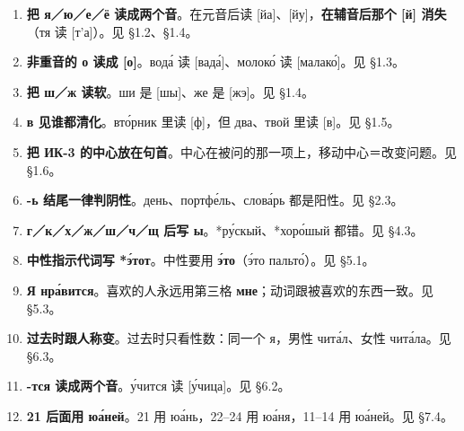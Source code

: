 
\begin{enumerate}[label=\textbf{\arabic*.}]
\item \textbf{把 я／ю／е／ё 读成两个音}。在元音后读 [йа]、[йу]，\textbf{在辅音后那个 [й] 消失}（тя 读 [т'а]）。见 \S1.2、\S1.4。
\item \textbf{非重音的 о 读成 [о]}。вода́ 读 [вада́]、молоко́ 读 [малако́]。见 \S1.3。
\item \textbf{把 ш／ж 读软}。ши 是 [шы]、же 是 [жэ]。见 \S1.4。
\item \textbf{в 见谁都清化}。вто́рник 里读 [ф]，但 два、твой 里读 [в]。见 \S1.5。
\item \textbf{把 ИК-3 的中心放在句首}。中心在被问的那一项上，移动中心＝改变问题。见 \S1.6。
\item \textbf{-ь 结尾一律判阴性}。день、портфе́ль、слова́рь 都是阳性。见 \S2.3。
\item \textbf{г／к／х／ж／ш／ч／щ 后写 ы}。*ру́скый、*хоро́шый 都错。见 \S4.3。
\item \textbf{中性指示代词写 *э́тот}。中性要用 \textbf{э́то}（э́то пальто́）。见 \S5.1。
\item \textbf{Я нра́вится}。喜欢的人永远用第三格 \textbf{мне}；动词跟被喜欢的东西一致。见 \S5.3。
\item \textbf{过去时跟人称变}。过去时只看性数：同一个 я，男性 чита́л、女性 чита́ла。见 \S6.3。
\item \textbf{-тся 读成两个音}。у́чится 读 [у́чица]。见 \S6.2。
\item \textbf{21 后面用 юа́ней}。21 用 юа́нь，22--24 用 юа́ня，11--14 用 юа́ней。见 \S7.4。
\end{enumerate}


